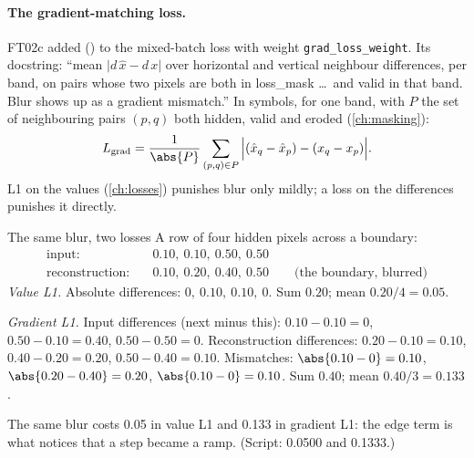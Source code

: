 
\paragraph{The gradient-matching loss.} 
FT02c added  () to the mixed-batch loss
with weight \texttt{grad\_loss\_weight}. Its docstring: ``mean $\lvert d\,\hat{x} - d\,x \rvert$ over horizontal and
vertical neighbour differences, per band, on pairs whose two pixels are both in loss\_mask \ldots\ and valid in that
band. Blur shows up as a gradient mismatch.'' In symbols, for one band, with $P$ the set of neighbouring pairs
$(p, q)$ both hidden, valid and eroded (\cref{ch:masking}):
\begin{equation}
L_\text{grad} = \frac{1}{\abs{P}} \sum_{(p,q) \in P} \Big\lvert (\hat{x}_q - \hat{x}_p) - (x_q - x_p) \Big\rvert .
\label{eq:ftruns:gradl1}
\end{equation}
L1 on the values (\cref{ch:losses}) punishes blur only mildly; a loss on the differences punishes it directly.

\begin{worked}[label={we:ftruns:gradl1}]{The same blur, two losses}
A row of four hidden pixels across a boundary:
\begin{align*}
\text{input:}\quad & 0.10,\ 0.10,\ 0.50,\ 0.50\\
\text{reconstruction:}\quad & 0.10,\ 0.20,\ 0.40,\ 0.50 \qquad\text{(the boundary, blurred)}
\end{align*}
\emph{Value L1.} Absolute differences: $0,\ 0.10,\ 0.10,\ 0$. Sum $0.20$; mean $0.20 / 4 = 0.05$.

\emph{Gradient L1.} Input differences (next minus this): $0.10 - 0.10 = 0$, $0.50 - 0.10 = 0.40$, $0.50 - 0.50 =
0$. Reconstruction differences: $0.20 - 0.10 = 0.10$, $0.40 - 0.20 = 0.20$, $0.50 - 0.40 = 0.10$. Mismatches:
$\abs{0.10 - 0} = 0.10$, $\abs{0.20 - 0.40} = 0.20$, $\abs{0.10 - 0} = 0.10$. Sum $0.40$; mean $0.40 / 3 = 0.133$.

The same blur costs 0.05 in value L1 and 0.133 in gradient L1: the edge term is what notices that a step became a
ramp. (Script: 0.0500 and 0.1333\tagC.)
\end{worked}

